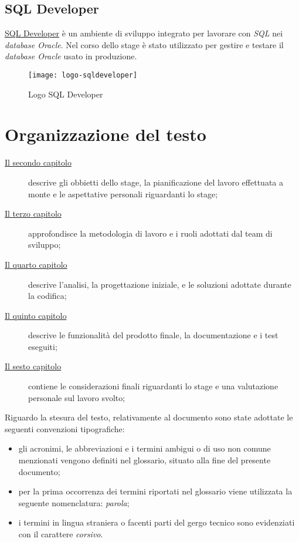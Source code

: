 \subsection{SQL Developer}
\href{https://www.oracle.com/database/technologies/appdev/sqldeveloper-landing.html}{SQL Developer} è un ambiente di sviluppo integrato per lavorare con \textit{SQL} nei \textit{database Oracle}. Nel corso dello stage è stato utilizzato per gestire e testare il \textit{database Oracle} usato in produzione.
\begin{figure}[h]
    \begin{center}
    \texttt{[image: logo-sqldeveloper]}
    \caption{Logo SQL Developer}
    \label{fig:figure13}
    \end{center}
\end{figure}

\section{Organizzazione del testo}

\begin{description}
    \item[{\hyperref[cap:obbiettivi-pianificazione]{Il secondo capitolo}}] descrive gli obbietti dello stage, la pianificazione del lavoro effettuata a monte e le aspettative personali riguardanti lo stage;
    
    \item[{\hyperref[cap:metodologia-lavoro]{Il terzo capitolo}}] approfondisce la metodologia di lavoro e i ruoli adottati dal team di sviluppo;
    
    \item[{\hyperref[cap:analisi]{Il quarto capitolo}}] descrive l'analisi, la progettazione iniziale, e le soluzioni adottate durante la codifica;
    
    \item[{\hyperref[cap:prodotto]{Il quinto capitolo}}] descrive le funzionalità del prodotto finale, la documentazione e i test eseguiti;
    
    \item[{\hyperref[cap:considerazioni]{Il sesto capitolo}}] contiene le considerazioni finali riguardanti lo stage e una valutazione personale sul lavoro svolto;

\end{description}

Riguardo la stesura del testo, relativamente al documento sono state adottate le seguenti convenzioni tipografiche:
\begin{itemize}
	\item gli acronimi, le abbreviazioni e i termini ambigui o di uso non comune menzionati vengono definiti nel glossario, situato alla fine del presente documento;
	\item per la prima occorrenza dei termini riportati nel glossario viene utilizzata la seguente nomenclatura: \emph{parola}\glsfirstoccur{};
	\item i termini in lingua straniera o facenti parti del gergo tecnico sono evidenziati con il carattere \emph{corsivo}.
\end{itemize}